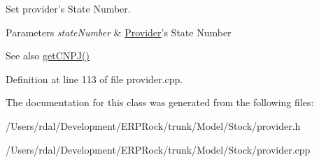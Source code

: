\-Set provider's \-State \-Number. 


\begin{DoxyParams}{\-Parameters}
{\em state\-Number} & \hyperlink{class_provider}{\-Provider}'s \-State \-Number \\
\hline
\end{DoxyParams}
\begin{DoxySeeAlso}{\-See also}
\hyperlink{class_provider_adf4ad60029bbe6ccdf0c2e0eaa31d85d}{get\-C\-N\-P\-J()} 
\end{DoxySeeAlso}


\-Definition at line 113 of file provider.\-cpp.



\-The documentation for this class was generated from the following files\-:\begin{DoxyCompactItemize}
\item 
/\-Users/rdal/\-Development/\-E\-R\-P\-Rock/trunk/\-Model/\-Stock/provider.\-h\item 
/\-Users/rdal/\-Development/\-E\-R\-P\-Rock/trunk/\-Model/\-Stock/provider.\-cpp\end{DoxyCompactItemize}
